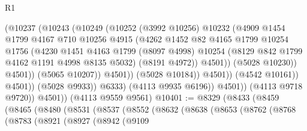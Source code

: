 \begin{lexlean}{R1}
\begin{coremodule}
                                    (@10237
                                      (@10243
                                        (@10249
                                          (@10252
                                            (@3992 @10256)
                                            @10232
                                            (@4909
                                              @1454
                                              @1799
                                              @4167
                                              @710
                                              @10256
                                              @4915
                                              (@4262
                                                @1452
                                                @82
                                                @4165
                                                @1799
                                                @10254
                                                @1756
                                                (@4230
                                                  @1451
                                                  @4163
                                                  @1799
                                                  (@8097 @4998)
                                                  @10254
                                                  (@8129 @842 @1799 @4162 @1191 @4998 @8135 @5032)
                                                  (@8191 @4972))
                                                @4501))
                                            (@5028 @10230))
                                          @4501))
                                      (@5065 @10207))
                                    @4501))
                                (@5028 @10184))
                              @4501))
                          (@4542 @10161))
                        @4501))
                    (@5028 @9933))
                  @6333)
                (@4113 @9935 @6196))
              @4501))
          (@4113 @9718 @9720))
        @4501))
    (@4113 @9559 @9561)
@10401 := @8329
    (@8433
      (@8459
        (@8465
          (@8480
            (@8531
              (@8537
                (@8552
                  (@8632
                    (@8638
                      (@8653
                        (@8762
                          (@8768
                            (@8783
                              (@8921
                                (@8927
                                  (@8942
                                    (@9109

\end{coremodule}
\end{lexlean}
